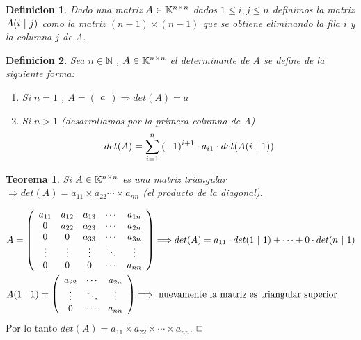 \documentclass[]{article}
\newtheorem{theorem}{Teorema}
\newtheorem{definition}{Definicion}
\newenvironment{proof}{\noindent{\bf Prueba:}}{$\hfill \Box$ \vspace{10pt}}
\newcommand{\ida}{\Longrightarrow}
\begin{document}
\newpage
\begin{definition}
    Dado una matriz $A \in \text{$\mathbb{K}^{n \times n}$}$ dados $1\leq i,j \leq n$ definimos la matriz $A(i \text{ $|$ } j)$ como la matriz $(n-1)\times (n-1)$
    que se obtiene eliminando la fila $i$ y la columna $j$ de A.
\end{definition}
\begin{definition}
    Sea $n \in \mathbb{N}$ , $A \in \text{$\mathbb{K}^{n \times n}$}$ el determinante de A se define de la siguiente forma:
    \begin{enumerate}
        \item Si $n=1$ , $A=\begin{pmatrix} a \end{pmatrix} \ida det(A)=a$
        \item Si $n>1$ (desarrollamos por la primera columna de A)
        \begin{align*}
            det(A)= \sum_{i=1}^{n}\: (-1)^{i+1} \cdot a_{i1} \cdot det(A(i \text{ $|$ } 1))
        \end{align*}
    \end{enumerate}
\end{definition}
\begin{theorem}
    Si $A \in \text{$\mathbb{K}^{n \times n}$}$ es una matriz triangular $\ida det(A)= a_{11} \times a_{22} \cdots \times a_{nn}$ (el producto de la diagonal).
\end{theorem}
\begin{proof}
    \begin{align*}
        &A=\begin{pmatrix}
            \begin{array}{ccccc}
            a_{11} & a_{12} & a_{13} & \cdots & a_{1n} \\
            0      & a_{22} & a_{23} & \cdots & a_{2n} \\
            0      & 0      & a_{33} & \cdots & a_{3n} \\
            \vdots & \vdots & \vdots & \ddots & \vdots \\
            0      & 0      & 0      & \cdots & a_{nn}
            \end{array}
        \end{pmatrix}
        \ida det(A)=a_{11}\cdot det(1\tq 1)+ \cdots + 0\cdot det(n\tq 1)\\
        &A(1\tq 1)=\begin{pmatrix}
            \begin{array}{ccc}
            a_{22} & \cdots & a_{2n} \\
            \vdots & \ddots & \vdots \\
            0      & \cdots & a_{nn}
            \end{array}
        \end{pmatrix}
        \ida \text{ nuevamente la matriz es triangular superior}
    \end{align*}
    Por lo tanto $det(A)= a_{11}\times a_{22}\times \cdots \times a_{nn}$.
\end{proof}
\end{document}
